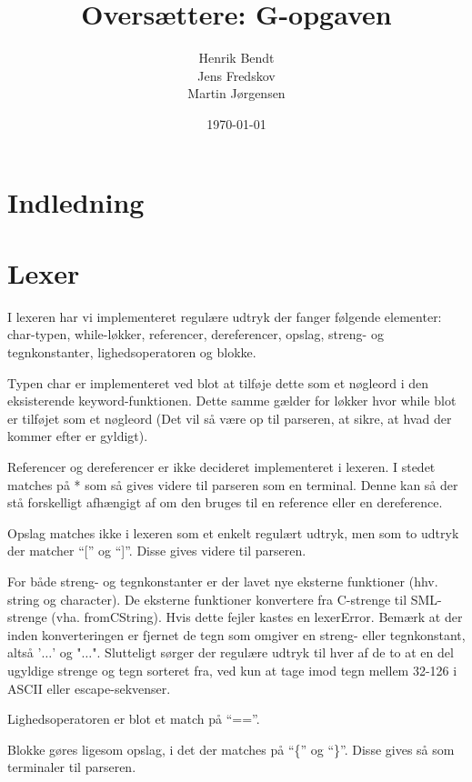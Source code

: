 \documentclass[a4paper, 10pt]{article}
\author{Henrik Bendt \\ Jens Fredskov \\ Martin Jørgensen}
\title{Oversættere: G-opgaven}
\date{\today}
\begin{document}
\maketitle
\pagebreak

\section{Indledning}

\section{Lexer}
I lexeren har vi implementeret regulære udtryk der fanger følgende elementer:
char-typen, while-løkker, referencer, dereferencer, opslag, streng- og tegnkonstanter,
lighedsoperatoren og blokke.

Typen char er implementeret ved blot at tilføje dette som et nøgleord i den
eksisterende keyword-funktionen. Dette samme gælder for løkker hvor while blot
er tilføjet som et nøgleord (Det vil så være op til parseren, at sikre, at hvad
der kommer efter er gyldigt).

Referencer og dereferencer er ikke decideret implementeret i lexeren. I stedet
matches på * som så gives videre til parseren som en terminal. Denne kan så
der stå forskelligt afhængigt af om den bruges til en reference eller en
dereference.

Opslag matches ikke i lexeren som et enkelt regulært udtryk, men som to udtryk
der matcher ``['' og ``]''. Disse gives videre til parseren.

For både streng- og tegnkonstanter er der lavet nye eksterne funktioner (hhv.
string og character). De eksterne funktioner konvertere fra C-strenge til
SML-strenge (vha. fromCString). Hvis dette fejler kastes en lexerError. Bemærk
at der inden konverteringen er fjernet de tegn som omgiver en streng- eller
tegnkonstant, altså '$\ldots$' og "$\ldots$". Slutteligt sørger der
regulære udtryk til hver af de to at en del ugyldige strenge og tegn sorteret
fra, ved kun at tage imod tegn mellem 32-126 i ASCII eller escape-sekvenser.

Lighedsoperatoren er blot et match på ``==''.

Blokke gøres ligesom opslag, i det der matches på ``\{'' og ``\}''. Disse gives
så som terminaler til parseren.
\end{document}
